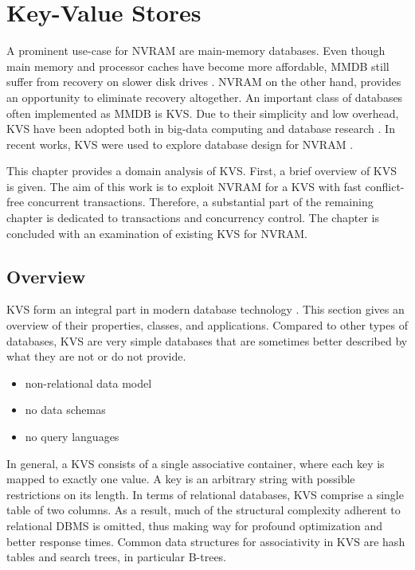 \chapter{Key-Value Stores}
\label{ch:kvs}

A prominent use-case for NVRAM are main-memory databases. Even though main
memory and processor caches have become more affordable, MMDB still suffer from
recovery on slower disk drives \cite{oukid2015instant, schwalb2016hyrise}. NVRAM
on the other hand, provides an opportunity to eliminate recovery altogether. An
important class of databases often implemented as MMDB is KVS. Due to their
simplicity and low overhead, KVS have been adopted both in big-data computing
and database research \cite{decandia2007dynamo, lakshman2010cassandra,
wang2015hydradb}. In recent works, KVS were used to explore database design for
NVRAM \cite{bailey2013exploring, zhou2016nvht, wu2016nvmcached}.

This chapter provides a domain analysis of KVS. First, a brief overview of KVS
is given. The aim of this work is to exploit NVRAM for a KVS with fast
conflict-free concurrent transactions. Therefore, a substantial part of the
remaining chapter is dedicated to transactions and concurrency control. The
chapter is concluded with an examination of existing KVS for NVRAM.

\section{Overview}

KVS form an integral part in modern database technology \cite{fiebig2016one}.
This section gives an overview of their properties, classes, and applications.
Compared to other types of databases, KVS are very simple databases that are
sometimes better described by what they are not or do not provide.

\begin{itemize}
    \item non-relational data model
    \item no data schemas
    \item no query languages
\end{itemize}

In general, a KVS consists of a single associative container, where each key is
mapped to exactly one value. A key is an arbitrary string with possible
restrictions on its length. In terms of relational databases, KVS comprise a
single table of two columns. As a result, much of the structural complexity
adherent to relational DBMS is omitted, thus making way for profound
optimization and better response times. Common data structures for associativity
in KVS are hash tables and search trees, in particular B-trees.

